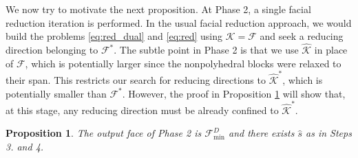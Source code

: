 \documentclass{article}
\newcommand{\minFaceD}{ {\mathcal{F}_{\min}^D}}
\newcommand{\stdCone}{ {\mathcal{K}}}
\newcommand{\stdFace}{ \mathcal{F}}
\newtheorem{proposition}[definition]{Proposition}
\begin{document}
We now try to motivate the next proposition. At Phase 2, a single facial reduction iteration is performed. In the usual facial reduction approach, we would build the problems \eqref{eq:red_dual} and \eqref{eq:red}
using $\stdCone = \stdFace$ and seek a reducing direction belonging to $\stdFace^*$. The subtle point in Phase 2 is that we
use $\hat \stdCone$ in place of $\stdFace$, which is potentially larger since the nonpolyhedral blocks were relaxed to their span. This restricts our search for reducing directions to 
$\hat \stdCone^*$, which is potentially smaller than $\stdFace^*$. However, the proof in Proposition \ref{prop:min_face} will show that, at this stage, 
any reducing direction must be already confined to $\hat \stdCone^*$.

\begin{proposition}\label{prop:min_face}
The output face of Phase 2 is $\minFaceD$ and there exists $\hat s$ as in Steps 3. and 4.
\end{proposition}
\end{document}
